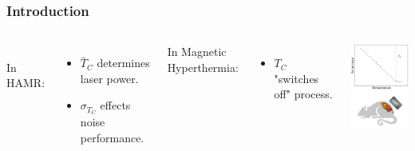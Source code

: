 \documentclass{beamer}
\begin{document}
\begin{frame}
	\frametitle{Introduction}
	\begin{columns}
		\column{7cm}
		\vspace{8mm} \\
		In HAMR\footnotemark[1]:
		\begin{itemize}
			\item{$\bar{T}_C$ determines laser power.}
			\item{$\sigma_{T_C}$ effects noise performance.}
		\end{itemize} \vspace{8mm}
		In Magnetic Hyperthermia:
		\begin{itemize}
		\item{$T_C$ "switches off" process.}
		\end{itemize}
		
		\column{5cm}
		\begin{center}
		\includegraphics[width=4cm]{Images/Anisotropy} \\ \vspace{3mm}
		\includegraphics[width=3.5cm]{Images/rat2}\footnotemark[2]
		\end{center}
	\end{columns}
\end{frame}
\end{document}
